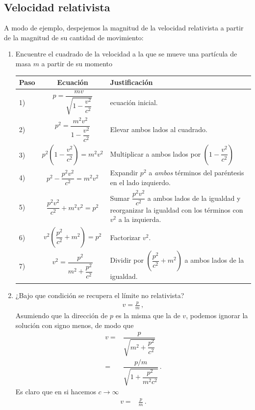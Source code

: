 \documentclass[11pt,a4paper]{book}
\begin{document}
\subsection{Velocidad relativista}
\label{sec:vfromp1d}
A modo de ejemplo, despejemos la magnitud de la velocidad relativista a partir de la magnitud de su cantidad de movimiento:
\begin{enumerate}
    \item Encuentre el cuadrado de la velocidad a la que se mueve una partícula de masa $m$ a partir de su momento

\renewcommand{\phantom}[1]{#1}

\noindent
 \hspace{-1cm}\begin{tabular*}{0.95\textwidth}{l|c|p{9cm}}
   \textbf{Paso} & \textbf{Ecuación}  & \textbf{Justificación} \\\hline
1)     & $p =\dfrac{m v}{\sqrt{1-\dfrac{v^2}{c^2}}}$   & ecuación inicial.\\[20pt]\hline
2) & $p^2  =\dfrac{m^2 v^2}{1-\dfrac{v^2}{c^2}} $& Elevar ambos lados al cuadrado. \\[20pt]\hline
3) & \phantom{$p^2\left(1-\dfrac{v^2}{c^2}\right)  =m^2 v^2 $}& Multiplicar a ambos lados por $\left(1-\dfrac{v^2}{c^2}\right)$ \\[5pt]\hline
4) & $p^2-\dfrac{p^2v^2}{c^2}  =m^2 v^2 $& Expandir $p^2$ a \emph{ambos} términos del paréntesis en el lado izquierdo. \\[5pt]\hline
5) & \phantom{$  \dfrac{p^2v^2}{c^2} + m^2 v^2 = p^2 $}& Sumar $\dfrac{p^2v^2}{c^2}$ a ambos lados de la igualdad y reorganizar la igualdad con los términos con $v^2$ a la izquierda. \\[5pt]\hline
6) & $v^2\left(\dfrac{p^2}{c^2} + m^2\right)= p^2 $& Factorizar $v^2$. \\[5pt]\hline
7) & \phantom{$v^2=\dfrac{p^2}{m^2 + \dfrac{p^2}{c^2}}$} & Dividir por $\left(\dfrac{p^2}{c^2} + m^2\right)$ a ambos lados de la igualdad. \\[20pt]\hline
\end{tabular*}
\item ¿Bajo que condición se recupera el límite no relativista?
\begin{align*}
    v = \frac{p}{m}\,,
\end{align*}
Asumiendo que la dirección de $p$ es la misma que la de $v$, podemos ignorar la solución con signo menos, de modo que
\begin{align*}
    v=&\dfrac{p}{\sqrt{m^2 + \dfrac{p^2}{c^2}}}\\
    =&\dfrac{p/m}{\sqrt{1 + \dfrac{p^2}{m^2c^2}}}\,.
\end{align*}
Es claro que en si hacemos $c\to \infty$
\begin{align*}
    v =& \frac{p}{m}\,.
\end{align*}

\end{enumerate}
\end{document}
